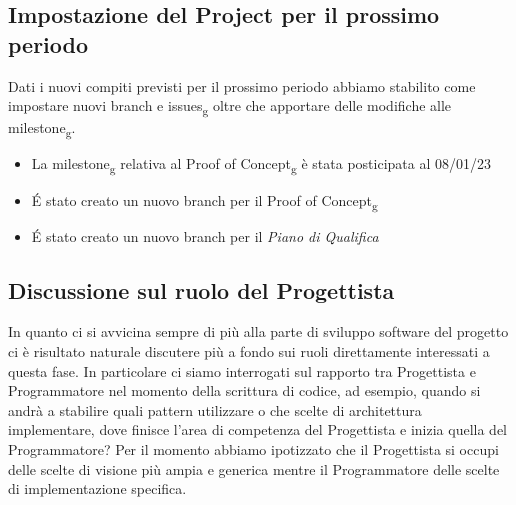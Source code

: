 \subsection{Impostazione del Project per il prossimo periodo}
Dati i nuovi compiti previsti per il prossimo periodo abbiamo stabilito come impostare nuovi branch e issues\textsubscript{g} oltre che apportare delle modifiche alle milestone\textsubscript{g}.
\begin{itemize}
	\item La milestone\textsubscript{g} relativa al Proof of Concept\textsubscript{g} è stata posticipata al 08/01/23
	\item É stato creato un nuovo branch per il Proof of Concept\textsubscript{g}
	\item É stato creato un nuovo branch per il \textit{Piano di Qualifica}
\end{itemize}

\subsection{Discussione sul ruolo del Progettista}
In quanto ci si avvicina sempre di più alla parte di sviluppo software del progetto ci è risultato naturale discutere più a fondo sui ruoli direttamente interessati a questa fase.
\newline In particolare ci siamo interrogati sul rapporto tra Progettista e Programmatore nel momento della scrittura di codice, ad esempio, quando si andrà a stabilire quali pattern utilizzare o che scelte di architettura implementare, dove finisce l'area di competenza del Progettista e inizia quella del Programmatore?
\newline Per il momento abbiamo ipotizzato che il Progettista si occupi delle scelte di visione più ampia e generica mentre il Programmatore delle scelte di implementazione specifica.
